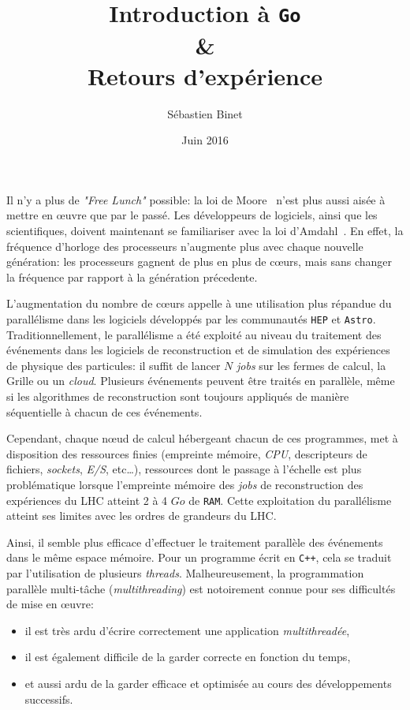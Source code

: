 \documentclass[a4paper,french]{article}
\title{Introduction \`a \texttt{Go}\\ \&\\ Retours d'exp\'erience}
\author{S\'ebastien Binet}
\date{Juin 2016}
\affil{CNRS/IN2P3/LPC}
\begin{document}
\maketitle

\section*{}

Il n'y a plus de \emph{"Free Lunch"} possible: la loi de Moore~\cite{ref-moore}
n'est plus aussi ais\'ee \`a mettre en {\oe}uvre que par le pass\'e.
Les d\'eveloppeurs de logiciels, ainsi que les scientifiques, doivent maintenant
se familiariser avec la loi d'Amdahl~\cite{ref-amdahl}.
En effet, la fr\'equence d'horloge des processeurs n'augmente plus avec chaque
nouvelle g\'en\'eration: les processeurs gagnent de plus en plus de c\oe urs,
mais sans changer la fr\'equence par rapport \`a la g\'en\'eration
pr\'ecedente.

L'augmentation du nombre de c\oe urs appelle \`a une utilisation plus
r\'epandue du parall\'elisme dans les logiciels d\'evelopp\'es par les
communaut\'es \texttt{HEP} et \texttt{Astro}.
Traditionnellement, le parall\'elisme a \'et\'e exploit\'e au niveau du
traitement des \'ev\'enements dans les logiciels de reconstruction et de
simulation des ex\-p\'e\-rien\-ces de physique des particules: il suffit de lancer $N$
\emph{jobs} sur les fermes de calcul, la Grille ou un \emph{cloud}.
Plusieurs \'ev\'enements peuvent \^etre trait\'es en parall\`ele, m\^eme si les
algorithmes de reconstruction sont toujours appliqu\'es de mani\`ere
s\'equentielle \`a chacun de ces \'ev\'enements.

Cependant, chaque n\oe ud de calcul h\'ebergeant chacun de ces programmes, met \`a
disposition des ressources finies (empreinte m\'emoire, \emph{CPU}, descripteurs
de fichiers, \emph{sockets}, \emph{E/S}, etc\ldots), ressources dont le passage \`a
l'\'echelle est plus probl\'ematique lorsque l'empreinte m\'emoire des \emph{jobs} de
reconstruction des exp\'e\-rien\-ces du LHC atteint 2 \`a 4 $Go$ de \texttt{RAM}.
Cette exploitation du parall\'elisme atteint ses limites avec les
ordres de grandeurs du LHC.

Ainsi, il semble plus efficace d'effectuer le traitement parall\`ele des
\'ev\'enements dans le m\^eme espace m\'emoire.
Pour un programme \'ecrit en \texttt{C++}, cela se traduit par l'utilisation de
plusieurs \emph{threads}.
Malheureusement, la programmation parall\`ele multi-t\^ache
(\emph{multithreading}) est notoirement connue pour ses difficult\'es de mise en
\oe uvre:
\begin{itemize}
	\item il est tr\`es ardu d'\'ecrire correctement une application \emph{multithread\'ee},
	\item il est \'egalement difficile de la garder correcte en fonction du
		temps,
	\item et aussi ardu de la garder efficace et optimis\'ee au cours des
		d\'eveloppements successifs.
\end{itemize}
\end{document}
